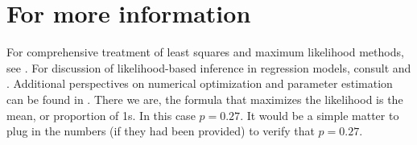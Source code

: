 \section*{For more information}
For comprehensive treatment of least squares and maximum likelihood methods, see \citep{eliason1993maximum}. For discussion of likelihood-based inference in regression models, consult \citep{fox} and \citep{gill2006essential}. Additional perspectives on numerical optimization and parameter estimation can be found in \citep{cameron2005microeconometrics}.
There we are, the formula that maximizes the likelihood is the mean, or proportion of 1s. In this case $p = 0.27$. It would be a simple matter to plug in the numbers (if they had been provided) to verify that $p = 0.27$.
